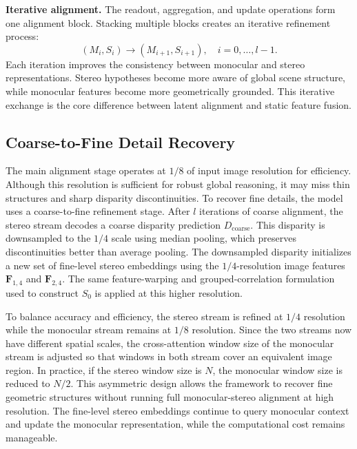 \noindent\textbf{Iterative alignment.} The readout, aggregation, and update operations form one alignment block.
Stacking multiple blocks creates an iterative refinement process:
\begin{equation} (M_i, S_i) \rightarrow (M_{i+1}, S_{i+1}), \quad i=0,\ldots,l-1. \end{equation}
Each iteration improves the consistency between monocular and stereo representations.
Stereo hypotheses become more aware of global scene structure, while monocular features become more geometrically grounded.
This iterative exchange is the core difference between latent alignment and static feature fusion.

\subsection{Coarse-to-Fine Detail Recovery}
The main alignment stage operates at $1/8$ of input image resolution for efficiency.
Although this resolution is sufficient for robust global reasoning, it may miss thin structures and sharp disparity discontinuities.
To recover fine details, the model uses a coarse-to-fine refinement stage.
After $l$ iterations of coarse alignment, the stereo stream decodes a coarse disparity prediction $D_{\mathrm{coarse}}$. 
This disparity is downsampled to the $1/4$ scale using median pooling, which preserves discontinuities better than average pooling.
The downsampled disparity initializes a new set of fine-level stereo embeddings using the $1/4$-resolution image features $\bm{F}_{1,4}$ and $\bm{F}_{2,4}$.
The same feature-warping and grouped-correlation formulation used to construct $S_0$ is applied at this higher resolution.

To balance accuracy and efficiency, the stereo stream is refined at $1/4$ resolution while the monocular stream remains at $1/8$ resolution.
Since the two streams now have different spatial scales, the cross-attention window size of the monocular stream is adjusted so that windows in both stream cover an equivalent image region.
In practice, if the stereo window size is $N$, the monocular window size is reduced to $N/2$.
This asymmetric design allows the framework to recover fine geometric structures without running full monocular-stereo alignment at high resolution.
The fine-level stereo embeddings continue to query monocular context and update the monocular representation, while the computational cost remains manageable.

